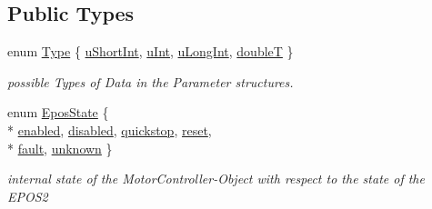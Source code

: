 \subsection*{Public Types}
\begin{DoxyCompactItemize}
\item 
enum \hyperlink{classEpos2MotorController_a5404c60266e24bb6c0ce60153ddcb774}{Type} \{ \hyperlink{classEpos2MotorController_a5404c60266e24bb6c0ce60153ddcb774a2b4b83649b11351ce20e5f3db7dd19f6}{u\-Short\-Int}, 
\hyperlink{classEpos2MotorController_a5404c60266e24bb6c0ce60153ddcb774a7cd8c8c80092885f086841058f4520a9}{u\-Int}, 
\hyperlink{classEpos2MotorController_a5404c60266e24bb6c0ce60153ddcb774ae8b4415995e33e0fdb3318c2bb0ec1fc}{u\-Long\-Int}, 
\hyperlink{classEpos2MotorController_a5404c60266e24bb6c0ce60153ddcb774a6560d2c46b97b38b3c8db72e25563fd2}{double\-T}
 \}
\begin{DoxyCompactList}\small\item\em possible Types of Data in the Parameter structures. \end{DoxyCompactList}\item 
enum \hyperlink{classEpos2MotorController_ab5ec630dfbb90ad674e311187926060c}{Epos\-State} \{ \\*
\hyperlink{classEpos2MotorController_ab5ec630dfbb90ad674e311187926060cae6493e2426163b114bea951ab9a419d5}{enabled}, 
\hyperlink{classEpos2MotorController_ab5ec630dfbb90ad674e311187926060caf0eea74682d3d3f21bec6e5b376cf443}{disabled}, 
\hyperlink{classEpos2MotorController_ab5ec630dfbb90ad674e311187926060caa83d02e81212676710b3c6d97cb30119}{quickstop}, 
\hyperlink{classEpos2MotorController_ab5ec630dfbb90ad674e311187926060cae80551bbe5d91631014d56926de2d402}{reset}, 
\\*
\hyperlink{classEpos2MotorController_ab5ec630dfbb90ad674e311187926060ca9c2b33ebbe5a72ad6d09d6af6531237c}{fault}, 
\hyperlink{classEpos2MotorController_ab5ec630dfbb90ad674e311187926060cad38c41836bbe157863e3eae0d308b7ca}{unknown}
 \}
\begin{DoxyCompactList}\small\item\em internal state of the Motor\-Controller-\/\-Object with respect to the state of the E\-P\-O\-S2 \end{DoxyCompactList}\end{DoxyCompactItemize}
